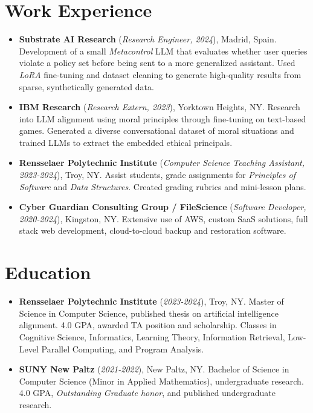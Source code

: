 \documentclass[11pt]{article}
\begin{document}
\section*{Work Experience}
\begin{itemize}
    \itemsep0em
    
    \item \textbf{Substrate AI Research} (\textit{Research Engineer, 2024}), Madrid, Spain. Development of a small \textit{Metacontrol} LLM that evaluates whether user queries violate a policy set before being sent to a more generalized assistant.  Used \textit{LoRA} fine-tuning and dataset cleaning to generate high-quality results from sparse, synthetically generated data.

    \item \textbf{IBM Research} (\textit{Research Extern, 2023}), Yorktown Heights, NY. Research into LLM alignment using moral principles through fine-tuning on text-based games. Generated a diverse conversational dataset of moral situations and trained LLMs to extract the embedded ethical principals.
    
    \item \textbf{Rensselaer Polytechnic Institute} (\textit{Computer Science Teaching Assistant, 2023-2024}), Troy, NY. Assist students, grade assignments for \textit{Principles of Software} and \textit{Data Structures}. Created grading rubrics and mini-lesson plans.
    
    \item \textbf{Cyber Guardian Consulting Group / FileScience} (\textit{Software Developer, 2020-2024}), Kingston, NY. Extensive use of AWS, custom SaaS solutions, full stack web development, cloud-to-cloud backup and restoration software.

\end{itemize}

\section*{Education}
\begin{itemize}
    \itemsep0em

    \item \textbf{Rensselaer Polytechnic Institute} (\textit{2023-2024}), Troy, NY. Master of Science in Computer Science, published thesis on artificial intelligence alignment.  4.0 GPA, awarded TA position and scholarship.  Classes in Cognitive Science, Informatics, Learning Theory, Information Retrieval, Low-Level Parallel Computing, and Program Analysis.
    
    \item \textbf{SUNY New Paltz} (\textit{2021-2022}), New Paltz, NY. Bachelor of Science in Computer Science (Minor in Applied Mathematics), undergraduate research. 4.0 GPA, \textit{Outstanding Graduate honor}, and published undergraduate research.

\end{itemize}
\end{document}
